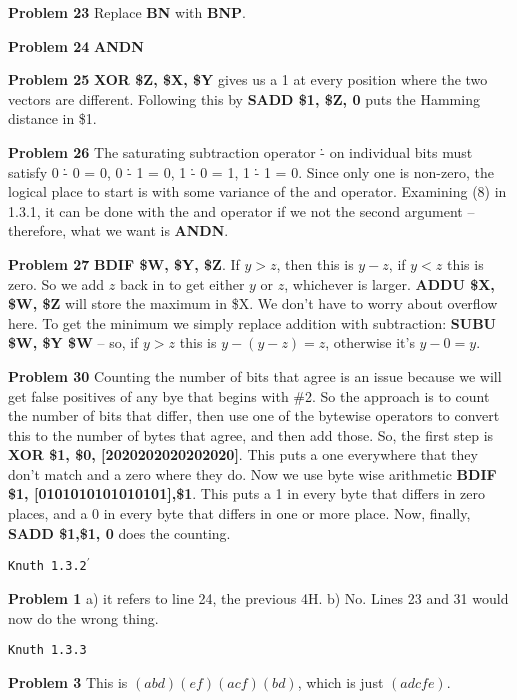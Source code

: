 \vskip 0.1in
\noindent
{\bf Problem 23} Replace {\bf BN} with {\bf BNP}.

\vskip 0.1in
\noindent
{\bf Problem 24} {\bf ANDN}

\vskip 0.1in
\noindent
{\bf Problem 25} {\bf XOR \$Z, \$X, \$Y} gives us a 1 at every
position where the two vectors are different.  Following this 
by {\bf SADD \$1, \$Z, 0} puts the Hamming distance in \$1.

\vskip 0.1in
\noindent
{\bf Problem 26} The saturating subtraction operator \.{-} on 
individual bits must satisfy 0 \.{-} 0 = 0, 0 \.{-} 1 = 0, 1 \.{-} 0 = 1,
1 \.{-} 1 = 0.  Since only one is non-zero, the logical place
to start is with some variance of the and operator.  Examining
(8) in 1.3.1, it can be done with the and operator if we not
the second argument -- therefore, what we want is {\bf ANDN}.

\vskip 0.1in
\noindent
{\bf Problem 27} {\bf BDIF \$W, \$Y, \$Z}.  If $y > z$, then this is
$y-z$, if $y < z$ this is zero.  So we add $z$ back in to get
either $y$ or $z$, whichever is larger. {\bf ADDU \$X, \$W, \$Z}
will store the maximum in \$X.  We don't have to worry about overflow
here.  To get the minimum we simply replace addition with subtraction:
{\bf SUBU \$W, \$Y \$W} -- so, if $y>z$ this is $y-\left(y-z\right)=z$, otherwise
it's $y-0=y$.

\vskip 0.1in
\noindent
{\bf Problem 30} Counting the number of bits that agree is an issue
because we will get false positives of any bye that begins with \#2.
So the approach is to count the number of bits that differ, then use
one of the bytewise operators to convert this to the number of bytes
that agree, and then add those.  So, the first step is 
 {\bf XOR \$1, \$0, [2020202020202020]}.  This puts a one
everywhere that they don't match and a zero where they do.  
Now we use byte wise arithmetic {\bf BDIF \$1, [0101010101010101],\$1}.
This puts a 1 in every byte that differs in zero places, and a 0 in every
byte that differs in one or more place.  Now, finally, {\bf SADD \$1,\$1, 0}
does the counting.

\vskip 0.5in
\centerline{ \tt Knuth 1.3.2$^{\prime}$ }
\vskip 0.3in

\noindent
{\bf Problem 1} a) it refers to line 24, the previous 4H. b)  No.  Lines 23 and 31 would now do the wrong thing.

\vskip 0.5in
\centerline{\tt Knuth 1.3.3}
\vskip 0.3in

\noindent
{\bf Problem 3} This is $\left(a b d\right)\left(e f\right) \left(a c f\right) \left(b d\right)$,
which is just $\left(a d c f e\right)$.

